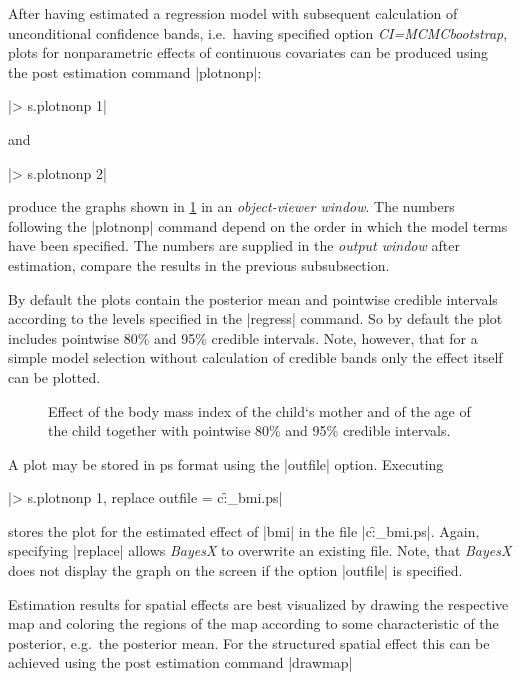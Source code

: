 After having estimated a regression model with subsequent calculation of unconditional confidence bands, i.e.~having specified
option {\it CI=MCMCbootstrap}, plots for nonparametric effects of continuous covariates can be produced using the post
estimation command |plotnonp|:

|> s.plotnonp 1|

and

|> s.plotnonp 2|

produce the graphs shown in \ref{step:bmi1} in an {\it object-viewer window}. The numbers following the |plotnonp| command
depend on the order in which the model terms have been specified. The numbers are supplied in the {\it output window} after
estimation, compare the results in the previous subsubsection.

By default the plots contain the posterior mean and pointwise credible intervals according to the levels specified in the
|regress| command. So by default the plot includes pointwise 80\% and 95\% credible intervals. Note, however, that for a simple
model selection without calculation of credible bands only the effect itself can be plotted.

\begin{figure}[ht]
\begin{center}
{\it\caption{Effect of the body mass index of the child`s mother and
of the age of the child together with pointwise 80\% and 95\%
credible intervals. \label{step:bmi1}}}
\end{center}
\end{figure}

A plot may be stored in ps format using the |outfile| option. Executing

|> s.plotnonp 1, replace outfile = c:\data\f_bmi.ps|

stores the plot for the estimated effect of |bmi| in the file |c:\data\f_bmi.ps|. Again, specifying |replace| allows {\it
BayesX} to overwrite an existing file. Note, that {\it BayesX} does not display the graph on the screen if the option |outfile|
is specified.

Estimation results for spatial effects are best visualized by drawing the respective map and coloring the regions of the map
according to some characteristic of the posterior, e.g.~the posterior mean. For the structured spatial effect this can be
achieved using the post estimation command |drawmap|

